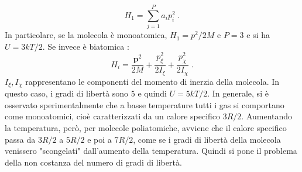 \begin{equation}
H_1=\sum_{j=1}^{P} a_i p_i^2\;.
\end{equation}
In particolare, se la molecola è monoatomica, $H_1=p^2/2M$ e $P=3$ e si ha $U=3kT/2$. Se invece è biatomica :
\begin{equation}
H_i=\frac{\mathbf{p}^2}{2M}+\frac{p_{\xi}^2}{2I_{\xi}}+\frac{p_{\chi}^2}{2I_{\chi}}\;.
\end{equation}
$I_{\xi},I_{\chi}$ rappresentano le componenti del momento di inerzia della molecola. In questo caso, i gradi di libertà sono $5$ e quindi $U=5kT/2$. In generale, si è osservato sperimentalmente che a basse temperature tutti i gas si comportano come monoatomici, cioè caratterizzati da un calore specifico $3R/2$. Aumentando la temperatura, però, per molecole poliatomiche, avviene che il calore specifico passa da $3R/2$ a $5R/2$ e poi a $7R/2$, come se i gradi di libertà della molecola venissero "scongelati" dall'aumento della temperatura. Quindi si pone il problema della non costanza del numero di gradi di libertà. \\

